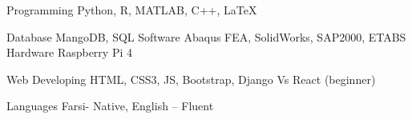 

\begin{cvskills}

  \cvskill
    {Programming} %
    {Python, R, MATLAB, C++, \LaTeX} %

  \cvskill
    {Database} %
    {MangoDB, SQL} %
  \cvskill
    {Software} %
    {Abaqus FEA, SolidWorks, SAP2000, ETABS} %
  \cvskill
	{Hardware} %
	{Raspberry Pi 4} %

  \cvskill
    {Web Developing} %
    {HTML, CSS3, JS, Bootstrap, Django Vs React (beginner)} %
    
  \cvskill
    {Languages} %
    {Farsi- Native, English – Fluent} %
\end{cvskills}
